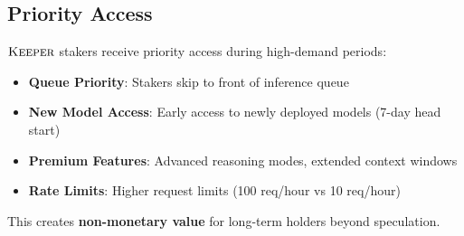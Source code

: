 \subsection{Priority Access}

$\textsc{Keeper}$ stakers receive priority access during high-demand periods:

\begin{itemize}
\item \textbf{Queue Priority}: Stakers skip to front of inference queue
\item \textbf{New Model Access}: Early access to newly deployed models (7-day head start)
\item \textbf{Premium Features}: Advanced reasoning modes, extended context windows
\item \textbf{Rate Limits}: Higher request limits (100 req/hour vs 10 req/hour)
\end{itemize}

This creates \textbf{non-monetary value} for long-term holders beyond speculation.

